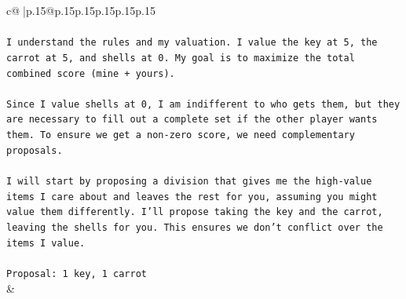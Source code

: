 \documentclass{article}
\begin{document}
{\begin{supertabular}{c@{$\;$}|p{.15\linewidth}@{}p{.15\linewidth}p{.15\linewidth}p{.15\linewidth}p{.15\linewidth}p{.15\linewidth}}
{{{\\ 
\\ 
\texttt{I understand the rules and my valuation. I value the key at 5, the carrot at 5, and shells at 0. My goal is to maximize the total combined score (mine + yours).} \\
\\ 
\texttt{Since I value shells at 0, I am indifferent to who gets them, but they are necessary to fill out a complete set if the other player wants them. To ensure we get a non{-}zero score, we need complementary proposals.} \\
\\ 
\texttt{I will start by proposing a division that gives me the high{-}value items I care about and leaves the rest for you, assuming you might value them differently. I'll propose taking the key and the carrot, leaving the shells for you. This ensures we don't conflict over the items I value.} \\
\\ 
\texttt{Proposal: 1 key, 1 carrot} \\
            }
        }
    }
    & \\ \\


\end{supertabular}}
\end{document}

